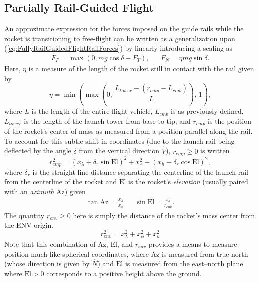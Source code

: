 \documentclass[11pt,dvipsnames]{thesis}
\begin{document}
\subsection{Partially Rail-Guided Flight}
An approximate expression for the forces imposed on the guide rails while the rocket is transitioning to free-flight can be written as a generalization upon (\ref{eq:FullyRailGuidedFlightRailForces}) by linearly introducing a scaling as
\begin{align}
F_P = \max(0, mg\cos\delta - F_T), && F_N = \eta mg\sin\delta.
\end{align}
Here, $\eta$ is a measure of the length of the rocket still in contact with the rail given by
\begin{equation}
\eta = \min\left(\max\left(0,\, \frac{L_{tower} - (r_{cmp} - L_{cmb})}{L}\right),\, 1\right),
\end{equation}
where $L$ is the length of the entire flight vehicle, $L_{cmb}$ is as previously defined, $L_{tower}$ is the length of the launch tower from base to tip, and $r_{cmp}$ is the position of the rocket's center of mass as measured from a position parallel along the rail. To account for this subtle shift in coordinates (due to the launch rail being deflected by the angle $\delta$ from the vertical direction $\widehat{V}$), $r_{cmp} \geqslant 0$ is written
\begin{equation}
r_{cmp}^2 = (x_\lambda + \delta_r\sin\mathrm{El})^2 + x_\phi^2 + (x_h - \delta_r\cos\mathrm{El})^2,
\end{equation}
where $\delta_r$ is the straight-line distance separating the centerline of the launch rail from the centerline of the rocket and $\mathrm{El}$ is the rocket's \textit{elevation} (usually paired with an \textit{azimuth} $\mathrm{Az}$) given
\begin{align}
\tan\mathrm{Az} = \frac{x_\lambda}{x_\phi} && \sin\mathrm{El} = \frac{x_h}{r_{env}}.
\end{align}
The quantity $r_{env} \geqslant 0$ here is simply the distance of the rocket's mass center from the ENV origin.
\begin{equation}
r_{env}^2 = {x_\lambda^2 + x_\phi^2 + x_h^2}
\end{equation}
Note that this combination of $\mathrm{Az}$, $\mathrm{El}$, and $r_{env}$ provides a means to measure position much like spherical coordinates, where $\mathrm{Az}$ is measured from true north (whose direction is given by $\widehat{N}$) and $\mathrm{El}$ is measured from the east--north plane where $\mathrm{El} > 0$ corresponds to a positive height above the ground. 
\end{document}
